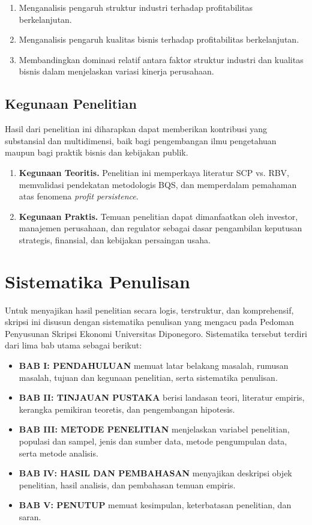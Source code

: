 \documentclass[12pt,a4paper]{report}
\begin{document}
\begin{enumerate}
    \item Menganalisis pengaruh struktur industri terhadap profitabilitas berkelanjutan.
    \item Menganalisis pengaruh kualitas bisnis terhadap profitabilitas berkelanjutan.
    \item Membandingkan dominasi relatif antara faktor struktur industri dan kualitas bisnis dalam menjelaskan variasi kinerja perusahaan.
\end{enumerate}

\subsection{Kegunaan Penelitian}

Hasil dari penelitian ini diharapkan dapat memberikan kontribusi yang substansial dan multidimensi, baik bagi pengembangan ilmu pengetahuan maupun bagi praktik bisnis dan kebijakan publik.

\begin{enumerate}
    \item \textbf{Kegunaan Teoritis.} Penelitian ini memperkaya literatur SCP vs. RBV, memvalidasi pendekatan metodologis BQS, dan memperdalam pemahaman atas fenomena \textit{profit persistence}.
    \item \textbf{Kegunaan Praktis.} Temuan penelitian dapat dimanfaatkan oleh investor, manajemen perusahaan, dan regulator sebagai dasar pengambilan keputusan strategis, finansial, dan kebijakan persaingan usaha.
\end{enumerate}

\section{Sistematika Penulisan}

Untuk menyajikan hasil penelitian secara logis, terstruktur, dan komprehensif, skripsi ini disusun dengan sistematika penulisan yang mengacu pada Pedoman Penyusunan Skripsi Ekonomi Universitas Diponegoro. Sistematika tersebut terdiri dari lima bab utama sebagai berikut:

\begin{itemize}
    \item \textbf{BAB I: PENDAHULUAN} memuat latar belakang masalah, rumusan masalah, tujuan dan kegunaan penelitian, serta sistematika penulisan.
    \item \textbf{BAB II: TINJAUAN PUSTAKA} berisi landasan teori, literatur empiris, kerangka pemikiran teoretis, dan pengembangan hipotesis.
    \item \textbf{BAB III: METODE PENELITIAN} menjelaskan variabel penelitian, populasi dan sampel, jenis dan sumber data, metode pengumpulan data, serta metode analisis.
    \item \textbf{BAB IV: HASIL DAN PEMBAHASAN} menyajikan deskripsi objek penelitian, hasil analisis, dan pembahasan temuan empiris.
    \item \textbf{BAB V: PENUTUP} memuat kesimpulan, keterbatasan penelitian, dan saran.
\end{itemize}
\end{document}
